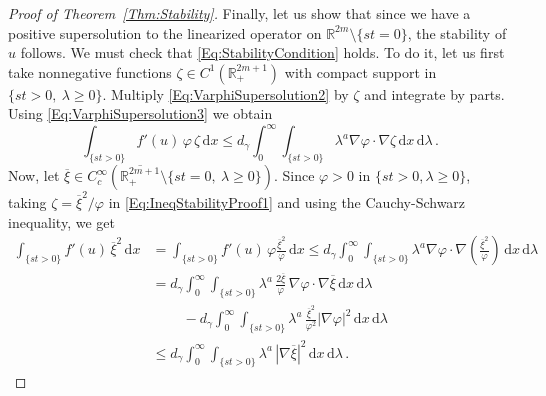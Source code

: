 \documentclass[twoside,leqno,symbols-for-thanks, draft]{rmi}
\numberwithin{equation}{section}
\theoremstyle{definition}
\newcommand{\con}[1]{\mathbb{#1}}
\newcommand{\R}{\con{R}} %
\newcommand{\s}{\gamma}
\renewcommand{\d}{\,\mathrm{d}} %
\begin{document}
\begin{proof}[Proof of Theorem~\ref{Thm:Stability}]
	
	Finally, let us show that since we have a positive supersolution to the linearized operator on $\R^{2m}\setminus \{st=0\}$, the stability of $u$ follows. We must check that \eqref{Eq:StabilityCondition} holds. To do it, let us first take nonnegative functions $\zeta\in C^1(\R^{2m+1}_+)$ with compact support in $\{st>0, \ \lambda \geq0\}$. Multiply \eqref{Eq:VarphiSupersolution2} by $\zeta$ and integrate by parts. Using \eqref{Eq:VarphiSupersolution3} we obtain
	\begin{equation}
	\label{Eq:IneqStabilityProof1}	
	\int_{\{st>0\}} f'(u) \, \varphi \, \zeta  \d x \leq d_\s \int_0^\infty \int_{\{st>0\}} \lambda^a \nabla{\varphi} \cdot \nabla{\zeta}  \d x \d \lambda\,.
	\end{equation}
	Now, let $\overline{\xi} \in C^\infty_c(\overline{\R^{2m+1}_+}\setminus \{st=0, \ \lambda \geq 0\})$. Since $\varphi > 0$ in $\{st>0, \lambda \geq 0\}$, taking $\zeta = \overline{\xi}^2/\varphi$ in \eqref{Eq:IneqStabilityProof1} and using the Cauchy-Schwarz inequality, we get
	\begin{align*}
	\int_{\{st>0\}}  \! f'(u)\,\overline{\xi}^2 \d x &= \int_{\{st>0\}} \! f'(u)\,\varphi \frac{\overline{\xi}^2}{\varphi} \d x \leq d_\s \int_0^\infty \! \!  \int_{\{st>0\}} \! \lambda^a \nabla{\varphi} \cdot \nabla{\left(\frac{\overline{\xi}^2}{\varphi}\right)} \d x \d \lambda \\
	&= d_\s \int_0^\infty \! \! \int_{\{st>0\}}\!  \lambda^a\,\frac{2\overline{\xi}}{\varphi} \,\nabla \varphi\cdot \nabla \overline{\xi}  \d x \d \lambda \\
	& \quad \ \quad - d_\s \int_0^\infty \! \!  \int_{\{st>0\}} \!  \lambda^a\,\frac{\overline{\xi}^2}{\varphi^2}|\nabla \varphi|^2  \d x \d \lambda \\
	&\leq d_\s \int_0^\infty \! \! \int_{\{st>0\}} \! \lambda^a\,|\nabla \overline{\xi}|^2  \d x \d \lambda\,.
	\end{align*}
	

\end{proof}
\end{document}
